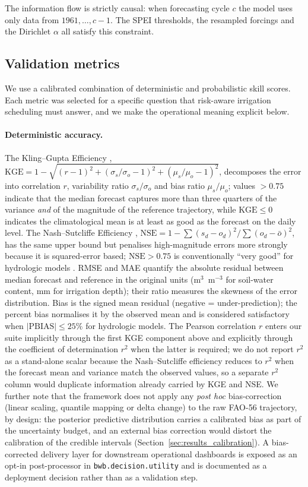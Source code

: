 \documentclass[review,5p,times]{elsarticle}
\begin{document}
The information flow is strictly causal: when forecasting cycle $c$
the model uses only data from $1961, \ldots, c-1$. The SPEI
thresholds, the resampled forcings and the Dirichlet $\alpha$ all
satisfy this constraint.

\subsection{Validation metrics}\label{sec:methods_metrics}

We use a calibrated combination of deterministic and probabilistic
skill scores. Each metric was selected for a specific question that
risk-aware irrigation scheduling must answer, and we make the
operational meaning explicit below.

\paragraph{Deterministic accuracy.} The Kling--Gupta Efficiency
\citep{Gupta2009},
$\mathrm{KGE}=1-\sqrt{(r-1)^2+(\sigma_s/\sigma_o-1)^2+(\mu_s/\mu_o-1)^2}$,
decomposes the error into correlation $r$, variability ratio
$\sigma_s/\sigma_o$ and bias ratio $\mu_s/\mu_o$; values $>0.75$
indicate that the median forecast captures more than three quarters
of the variance \emph{and} of the magnitude of the reference
trajectory, while $\mathrm{KGE}\leq 0$ indicates the climatological
mean is at least as good as the forecast on the daily level. The
Nash--Sutcliffe Efficiency \citep{NashSutcliffe1970},
$\mathrm{NSE}=1-\sum (s_d-o_d)^2/\sum(o_d-\bar o)^2$, has the same
upper bound but penalises high-magnitude errors more strongly because
it is squared-error based; $\mathrm{NSE}>0.75$ is conventionally
``very good'' for hydrologic models \citep{Moriasi2007}. RMSE and
MAE quantify the absolute residual between median forecast and
reference in the original units (m$^3$~m$^{-3}$ for soil-water
content, mm for irrigation depth); their ratio measures the
skewness of the error distribution. Bias is the signed mean
residual (negative = under-prediction); the percent bias
\citep{Moriasi2007} normalises it by the observed mean and is
considered satisfactory when $|\mathrm{PBIAS}|\leq 25\%$ for
hydrologic models. The Pearson correlation $r$ enters our suite
implicitly through the first KGE component above and explicitly
through the coefficient of determination $r^2$ when the latter is
required; we do not report $r^2$ as a stand-alone scalar because
the Nash--Sutcliffe efficiency reduces to $r^2$ when the forecast
mean and variance match the observed values, so a separate $r^2$
column would duplicate information already carried by KGE and NSE.
We further note that the framework does not apply any \emph{post
hoc} bias-correction (linear scaling, quantile mapping or delta
change) to the raw FAO-56 trajectory, by design: the posterior
predictive distribution carries a calibrated bias as part of the
uncertainty budget, and an external bias correction would distort
the calibration of the credible intervals (Section~\ref{sec:results_calibration}).
A bias-corrected delivery layer for downstream operational dashboards
is exposed as an opt-in post-processor in
\verb|bwb.decision.utility| and is documented as a deployment
decision rather than as a validation step.
\end{document}
